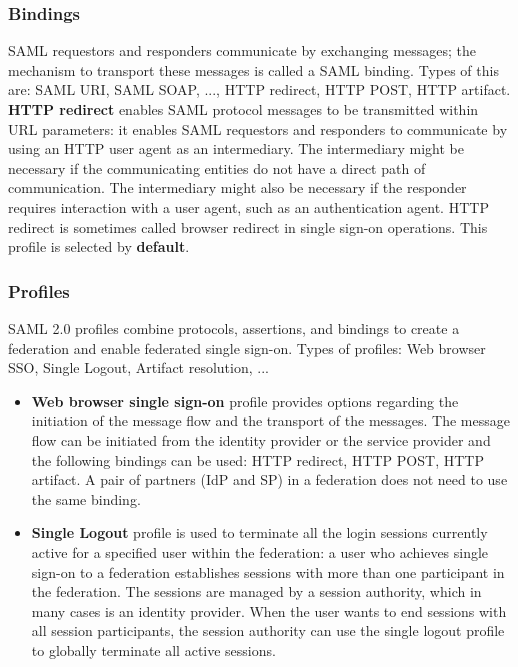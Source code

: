 \documentclass[a4paper, 10pt, titlepage]{article}
\begin{document}
\subsubsection*{Bindings}
SAML requestors and responders communicate by exchanging messages; the mechanism to transport these messages is called a SAML binding. Types of this are: SAML URI, SAML SOAP, ..., HTTP redirect, HTTP POST, HTTP artifact. \textbf{HTTP redirect} enables SAML protocol messages to be transmitted within URL parameters: it enables SAML requestors and responders to communicate by using an HTTP user agent as an intermediary. The intermediary might be necessary if the communicating entities do not have a direct path of communication. The intermediary might also be necessary if the responder requires interaction with a user agent, such as an authentication agent. HTTP redirect is sometimes called browser redirect in single sign-on operations. This profile is selected by \textbf{default}.

\subsubsection*{Profiles}
SAML 2.0 profiles combine protocols, assertions, and bindings to create a federation and enable federated single sign-on. Types of profiles: Web browser SSO, Single Logout, Artifact resolution, ...
\begin{itemize}
\item \textbf{Web browser single sign-on} profile provides options regarding the initiation of the message flow and the transport of the messages. The message flow can be initiated from the identity provider or the service provider and the following bindings can be used: HTTP redirect, HTTP POST, HTTP artifact. A pair of partners (IdP and SP) in a federation does not need to use the same binding.
\item \textbf{Single Logout} profile is used to terminate all the login sessions currently active for a specified user within the federation: a user who achieves single sign-on to a federation establishes sessions with more than one participant in the federation. The sessions are managed by a session authority, which in many cases is an identity provider. When the user wants to end sessions with all session participants, the session authority can use the single logout profile to globally terminate all active sessions. 
\end{itemize}
\end{document}
